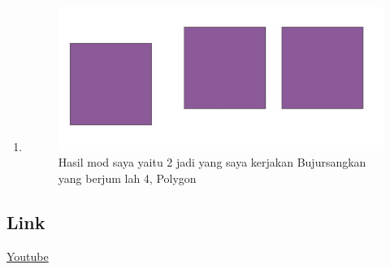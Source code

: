 \begin{enumerate}
	\item 
	
	\begin{figure}[H]
		\includegraphics[width=12cm]{figures/1174034/No10.JPG}
		\centering
		\caption{Hasil mod saya yaitu 2 jadi yang saya kerjakan Bujursangkan yang berjum lah 4, Polygon}
	\end{figure}	
\end{enumerate}

\subsection{Link}
\href{https://youtu.be/6yC39f_oqOc}{Youtube}